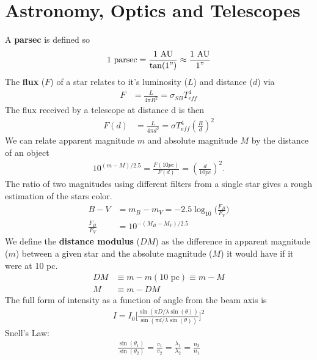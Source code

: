 \chapter{Astronomy, Optics and Telescopes}
\thispagestyle{fancy}
\begin{multicols}{2}
A \textbf{parsec} is defined so
\begin{align}
1 \textrm{ parsec}=\frac{1\textrm{ AU}}{\tan(1")} \approx \frac{1\textrm{ AU}}{1"}
\end{align}
The \textbf{flux} ($F$) of a star relates to it's luminosity ($L$) and distance ($d$) via
\begin{align}
F  &= \frac{L}{4\pi R^2} = \sigma_{SB} T_{eff}^4
\end{align}
The flux received by a telescope at distance d is then
\begin{align}
	F(d)  &= \frac{L}{4\pi d^2} = \sigma T_{eff}^4\left(\frac{R}{d}\right)^2
\end{align}
We can relate apparent magnitude $m$ and absolute magnitude $M$ by the distance of an object
\begin{align}
	10^{(m-M)/2.5} =\frac{F(10pc)}{F(d)} = \left(\frac{d}{10pc}\right)^2.
\end{align}
The ratio of two magnitudes using different filters from a single star gives a rough estimation of the stars color.
\begin{align}
B-V&=m_B-m_V=-2.5\log_{10}\bigg(\frac{F_B}{F_V}\bigg) \\
\frac{F_B}{F_V}&=10^{-(M_B-M_V)/2.5}
\end{align}
We define the \textbf{distance modulus} ($DM$) as the difference in apparent magnitude ($m$) between a given star and the absolute magnitude ($M$) it would have if it were at 10 pc.
\begin{align}
DM &\equiv m-m(10 \textrm{ pc}) \equiv m-M \\
M &\equiv m-DM
\end{align}
The full form of intensity as a function of angle from the beam axis is
\begin{align}
I=I_0\bigg[\frac{\sin(\pi D/\lambda \sin(\theta))}{\sin(\pi d/\lambda \sin(\theta))} \bigg]^2
\end{align}
Snell's Law: 
\begin{align}
\frac{\sin(\theta_1)}{\sin(\theta_2)} = \frac{v_1}{v_2} = \frac{\lambda_1}{\lambda_2}=\frac{n_2}{n_1}
\end{align}







\end{multicols}
